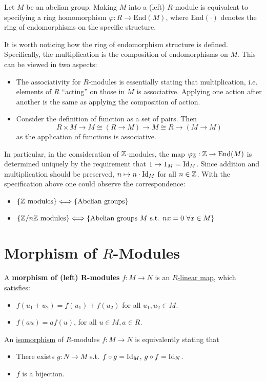 \begin{remark}
    Let $M$ be an abelian group. Making $M$ into a (left) $R$-module is equivalent to specifying a ring homomorphism $\varphi: R\to \mathrm{End}(M)$, where $\mathrm{End}(\cdot)$ denotes the ring of endomorphisms on the specific structure. 
    
    It is worth noticing how the ring of endomorphism structure is defined. Specifically, the multiplication is the composition of endomorphisms on $M$. This can be viewed in two aspects:
    \begin{itemize}
        \item The associativity for $R$-modules is essentially stating that multiplication, i.e. elements of $R$ ``acting'' on those in $M$ is associative. Applying one action after another is the same as applying the composition of action.  
        \item Consider the definition of function as a set of pairs. Then
        \[
            R\times M \to M \cong (R\to M) \to M \cong R\to(M\to M)
        \]
        as the application of functions is associative. 
    \end{itemize}

    In particular, in the consideration of $\mathbb{Z}$-modules, the map $\varphi_{\mathbb{Z}}: \mathbb{Z} \to \mathrm{End}(M)$ is determined uniquely by the requirement that $1\mapsto 1_M = \mathrm{Id}_M$. Since addition and multiplication should be preserved, $n\mapsto n\cdot \mathrm{Id}_{M}$ for all $n\in \mathbb{Z}$. With the specification above one could observe the correspondence:
    \begin{itemize}
        \item $\{\mathbb{Z} \text{ modules}\} \Longleftrightarrow \{ \text{Abelian groups} \}$
        \item  $\{\Z/n\Z \text{ modules}\} \Longleftrightarrow \{ \text{Abelian groups } M \text{ s.t. } nx = 0\ \forall x\in M \}$
    \end{itemize}
\end{remark}

\section{Morphism of $R$-Modules}

\begin{definition}
    A \textbf{morphism of (left) $\bm{R}$-modules} $f: M\to N$ is an \underline{$R$-linear map}, which satisfies:
    \begin{itemize}
        \item $f(u_1 + u_2) = f(u_1) + f(u_2)$ for all $u_1, u_2\in M$.
        \item $f(au) = af(u)$, for all $u \in M, a\in R$.
    \end{itemize} 

    An \underline{isomorphism} of $R$-modules $f: M\to N$ is equivalently stating that
    \begin{itemize}
        \item There exists $g: N\to M$ s.t. $f\circ g = \mathrm{Id}_{M}$, $g\circ f = \mathrm{Id}_{N}$.
        \item $f$ is a bijection.
    \end{itemize}
\end{definition}

